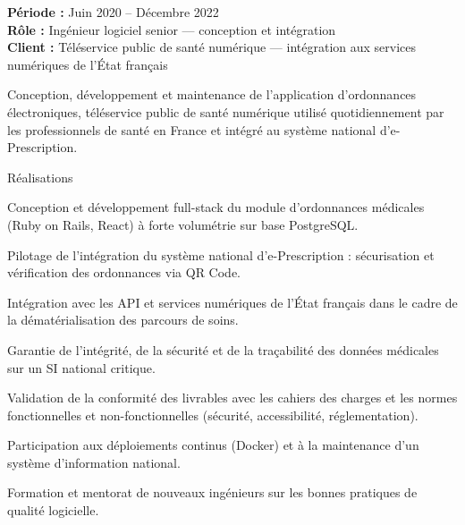 \begin{cvgroup}

\end{cvgroup}

\begin{cvgroup}

\begin{cvmetadata}
\textbf{Période :} Juin 2020 – Décembre 2022 \\
\textbf{Rôle :} Ingénieur logiciel senior — conception et intégration \\
\textbf{Client :} Téléservice public de santé numérique — intégration aux services numériques de l'État français
\end{cvmetadata}

\begin{cvprojectsummary}
Conception, développement et maintenance de l'application d'ordonnances électroniques, téléservice public de santé numérique utilisé quotidiennement par les professionnels de santé en France et intégré au système national d'e-Prescription.
\end{cvprojectsummary}

\begin{cvdetailslist}{Réalisations}
  \item {Conception et développement full-stack du module d'ordonnances médicales (Ruby on Rails, React) à forte volumétrie sur base PostgreSQL.}
  \item {Pilotage de l'intégration du système national d'e-Prescription : sécurisation et vérification des ordonnances via QR Code.}
  \item {Intégration avec les API et services numériques de l'État français dans le cadre de la dématérialisation des parcours de soins.}
  \item {Garantie de l'intégrité, de la sécurité et de la traçabilité des données médicales sur un SI national critique.}
  \item {Validation de la conformité des livrables avec les cahiers des charges et les normes fonctionnelles et non-fonctionnelles (sécurité, accessibilité, réglementation).}
  \item {Participation aux déploiements continus (Docker) et à la maintenance d'un système d'information national.}
  \item {Formation et mentorat de nouveaux ingénieurs sur les bonnes pratiques de qualité logicielle.}
\end{cvdetailslist}


\end{cvgroup}
